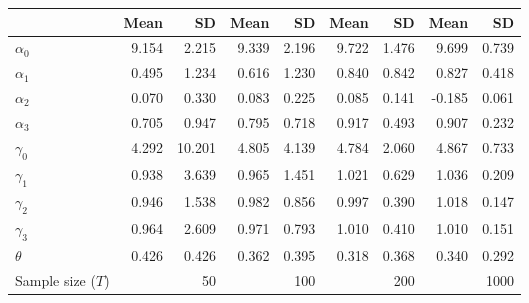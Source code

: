 
\begin{tabular}[t]{lrrrrrrrr}
\toprule
  & Mean & SD & Mean  & SD  & Mean   & SD   & Mean    & SD   \\
\midrule
$\alpha_{0}$ & 9.154 & 2.215 & 9.339 & 2.196 & 9.722 & 1.476 & 9.699 & 0.739\\
$\alpha_{1}$ & 0.495 & 1.234 & 0.616 & 1.230 & 0.840 & 0.842 & 0.827 & 0.418\\
$\alpha_{2}$ & 0.070 & 0.330 & 0.083 & 0.225 & 0.085 & 0.141 & -0.185 & 0.061\\
$\alpha_{3}$ & 0.705 & 0.947 & 0.795 & 0.718 & 0.917 & 0.493 & 0.907 & 0.232\\
$\gamma_{0}$ & 4.292 & 10.201 & 4.805 & 4.139 & 4.784 & 2.060 & 4.867 & 0.733\\
$\gamma_{1}$ & 0.938 & 3.639 & 0.965 & 1.451 & 1.021 & 0.629 & 1.036 & 0.209\\
$\gamma_{2}$ & 0.946 & 1.538 & 0.982 & 0.856 & 0.997 & 0.390 & 1.018 & 0.147\\
$\gamma_{3}$ & 0.964 & 2.609 & 0.971 & 0.793 & 1.010 & 0.410 & 1.010 & 0.151\\
$\theta$ & 0.426 & 0.426 & 0.362 & 0.395 & 0.318 & 0.368 & 0.340 & 0.292\\
Sample size ($T$) &  & 50 &  & 100 &  & 200 &  & 1000\\
\bottomrule
\end{tabular}
